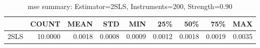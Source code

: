 \begin{table}[ht]
\centering
\caption{mse summary: Estimator=2SLS, Instruments=200, Strength=0.90}
\begin{tabular}{lrrrrrrrr}
\toprule
 & COUNT & MEAN & STD & MIN & 25\% & 50\% & 75\% & MAX \\
\midrule
2SLS & 10.0000 & 0.0018 & 0.0008 & 0.0009 & 0.0012 & 0.0018 & 0.0019 & 0.0035 \\
\bottomrule
\end{tabular}
\end{table}
